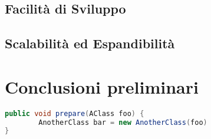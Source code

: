 \subsection{Facilità di Sviluppo}
\subsection{Scalabilità ed Espandibilità}

\newpage
\section{Conclusioni preliminari}
\label{sec:ConclusioniTecnologie}

\newpage


\begin{lstlisting}[language=Java, label=lst:java, caption={Some code in another language than the default one}]
public void prepare(AClass foo) {
        AnotherClass bar = new AnotherClass(foo)
}
\end{lstlisting}
